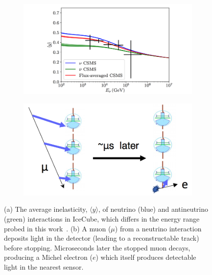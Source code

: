 \documentclass[a4paper,11pt]{article}
\begin{document}
\begin{figure}
    \begin{subfigure}[b]{0.5\textwidth}
    \centering
    \includegraphics[trim=2.0cm 0.0cm 1.0cm 0.0cm, clip=true, width=\linewidth]{images/inelasticity.png}
    \caption{\label{fig:inelasticity}}
    \end{subfigure}
    \begin{subfigure}[b]{0.5\textwidth}
    \centering
    \includegraphics[trim=0.0cm 0.0cm 0.0cm 0.0cm, clip=true, width=\linewidth]{images/michel_electron.png}
    \caption{\label{fig:michel_electron}}
    \end{subfigure}
    \caption{(a) The average inelasticity, $\langle y \rangle$, of neutrino (blue) and antineutrino (green) interactions in IceCube, which differs in the energy range probed in this work~\cite{Aartsen:2018vez}. (b) A muon ($\mu$) from a neutrino interaction deposits light in the detector (leading to a reconstructable track) before stopping. Microseconds later the stopped muon decays, producing a Michel electron ($e$) which itself produces detectable light in the nearest sensor.}
    \vspace{-7pt}
\end{figure}
\end{document}
